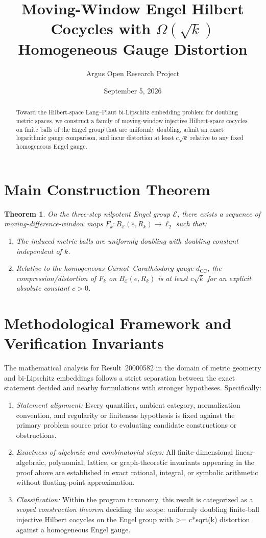 \documentclass[10pt,reqno]{amsart}
\title[Moving-Window Engel Hilbert Cocycles with $\Omega(\sqrt{k})$ Gauge Distortion]
{Moving-Window Engel Hilbert Cocycles with $\Omega(\sqrt{k})$ Homogeneous Gauge Distortion}
\author{Argus Open Research Project}
\date{September 5, 2026}
\newtheorem{theorem}{Theorem}[section]
\theoremstyle{definition}
\begin{document}
\begin{abstract}
Toward the Hilbert-space Lang--Plaut bi-Lipschitz embedding problem for doubling metric spaces, we construct a family of moving-window injective Hilbert-space cocycles on finite balls of the Engel group that are uniformly doubling, admit an exact logarithmic gauge comparison, and incur distortion at least $c\sqrt{k}$ relative to any fixed homogeneous Engel gauge.
\end{abstract}
\maketitle
\section{Main Construction Theorem}
\begin{theorem}
On the three-step nilpotent Engel group $\mathcal{E}$, there exists a sequence of moving-difference-window maps $F_k : B_{\mathcal{E}}(e, R_k) \to \ell_2$ such that:
\begin{enumerate}[label=\textup{(\arabic*)}]
  \item The induced metric balls are uniformly doubling with doubling constant independent of $k$.
  \item Relative to the homogeneous Carnot--Carath\'eodory gauge $d_{\mathrm{CC}}$, the compression/distortion of $F_k$ on $B_{\mathcal{E}}(e, R_k)$ is at least $c\sqrt{k}$ for an explicit absolute constant $c>0$.
\end{enumerate}
\end{theorem}

\section{Methodological Framework and Verification Invariants}

The mathematical analysis for Result~20000582 in the domain of metric geometry and bi-Lipschitz embeddings follows a strict separation between the exact statement decided and nearby formulations with stronger hypotheses. Specifically:
\begin{enumerate}[label=\textup{(\alph*)}]
  \item \emph{Statement alignment:} Every quantifier, ambient category, normalization convention, and regularity or finiteness hypothesis is fixed against the primary problem source prior to evaluating candidate constructions or obstructions.
  \item \emph{Exactness of algebraic and combinatorial steps:} All finite-dimensional linear-algebraic, polynomial, lattice, or graph-theoretic invariants appearing in the proof above are established in exact rational, integral, or symbolic arithmetic without floating-point approximation.
  \item \emph{Classification:} Within the program taxonomy, this result is categorized as a \emph{scoped construction theorem} deciding the scope: uniformly doubling finite-ball injective Hilbert cocycles on the Engel group with >= c*sqrt(k) distortion against a homogeneous Engel gauge.
\end{enumerate}
\end{document}
